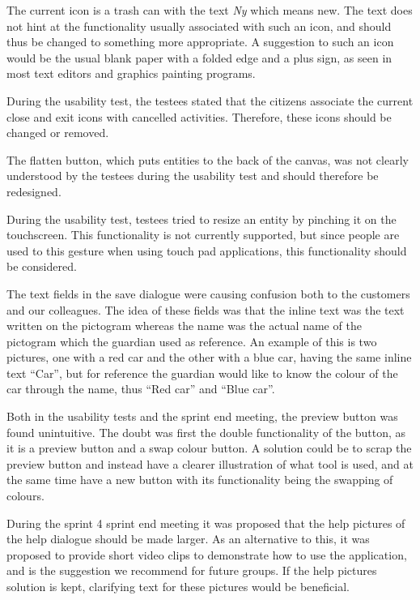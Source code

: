 \begin{description}[style=nextline]
\item[New icon for clearing the canvas]
The current icon is a trash can with the text \textit{Ny} which means new. 
The text does not hint at the functionality usually associated with such an icon, and should thus be changed to something more appropriate.
A suggestion to such an icon would be the usual blank paper with a folded edge and a plus sign, as seen in most text editors and graphics painting programs. 

\item[Close and exit icons]
During the usability test, the testees stated that the citizens associate the current close and exit icons with cancelled activities.
Therefore, these icons should be changed or removed.

\item[Flatten button icon]
The flatten button, which puts entities to the back of the canvas, was not clearly understood by the testees during the usability test and should therefore be redesigned.

\item[Pinching]
During the usability test, testees tried to resize an entity by pinching it on the touchscreen. 
This functionality is not currently supported, but since people are used to this gesture when using touch pad applications, this functionality should be considered.

\item[Names in save dialogue]
The text fields in the save dialogue were causing confusion both to the customers and our colleagues.
The idea of these fields was that the inline text was the text written on the pictogram whereas the name was the actual name of the pictogram which the guardian used as reference.
An example of this is two pictures, one with a red car and the other with a blue car, having the same inline text ``Car'', but for reference the guardian would like to know the colour of the car through the name, thus ``Red car'' and ``Blue car''.

\item[Rethink preview button]
Both in the usability tests and the sprint end meeting, the preview button was found unintuitive.
The doubt was first the double functionality of the button, as it is a preview button and a swap colour button.
A solution could be to scrap the preview button and instead have a clearer illustration of what tool is used, and at the same time have a new button with its functionality being the swapping of colours.

\item[Alternative help dialogue]
During the sprint 4 sprint end meeting it was proposed that the help pictures of the help dialogue should be made larger.
As an alternative to this, it was proposed to provide short video clips to demonstrate how to use the application, and is the suggestion we recommend for future groups.
If the help pictures solution is kept, clarifying text for these pictures would be beneficial.


\end{description}
